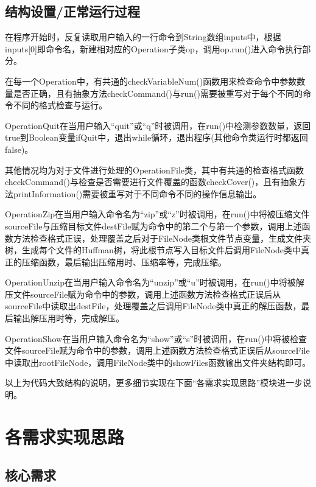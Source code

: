 \documentclass[11pt,a4paper]{article}
\begin{document}
\subsection*{结构设置/正常运行过程}
\par{在程序开始时，反复读取用户输入的一行命令到String数组inputs中，根据inputs[0]即命令名，新建相对应的Operation子类op，调用op.run()进入命令执行部分。}
\par{在每一个Operation中，有共通的checkVariableNum()函数用来检查命令中参数数量是否正确，且有抽象方法checkCommand()与run()需要被重写对于每个不同的命令不同的格式检查与运行。}
\par{OperationQuit在当用户输入“quit”或“q”时被调用，在run()中检测参数数量，返回true到Boolean变量ifQuit中，退出while循环，退出程序(其他命令类运行时都返回false)。}
\par{其他情况均为对于文件进行处理的OperationFile类，其中有共通的检查格式函数checkCommand()与检查是否需要进行文件覆盖的函数checkCover()，且有抽象方法printInformation()需要被重写对于不同命令不同的操作信息输出。}
\par{OperationZip在当用户输入命令名为“zip”或“z”时被调用，在run()中将被压缩文件sourceFile与压缩目标文件destFile赋为命令中的第二个与第一个参数，调用上述函数方法检查格式正误，处理覆盖之后对于FileNode类根文件节点变量，生成文件夹树，生成每个文件的Huffman树，将此根节点写入目标文件后调用FileNode类中真正的压缩函数，最后输出压缩用时、压缩率等，完成压缩。}
\par{OperationUnzip在当用户输入命令名为“unzip”或“u”时被调用，在run()中将被解压文件sourceFile赋为命令中的参数，调用上述函数方法检查格式正误后从sourceFile中读取出destFile，处理覆盖之后调用FileNode类中真正的解压函数，最后输出解压用时等，完成解压。}
\par{OperationShow在当用户输入命令名为“show”或“s”时被调用，在run()中将被检查文件sourceFile赋为命令中的参数，调用上述函数方法检查格式正误后从sourceFile中读取出rootFileNode，调用FileNode类中的showFiles函数输出文件夹结构即可。}
\par{以上为代码大致结构的说明，更多细节实现在下面“各需求实现思路”模块进一步说明。}
\section{各需求实现思路}
\subsection*{核心需求}
\end{document}
